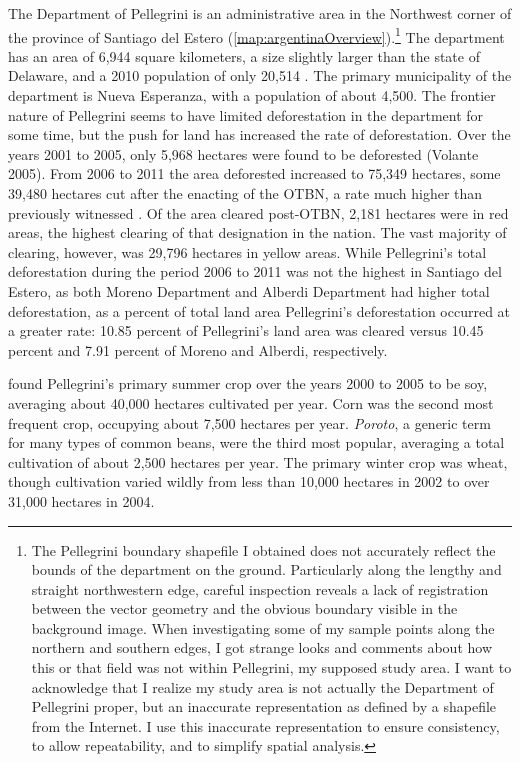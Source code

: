 The Department of Pellegrini is an administrative area in the Northwest corner of the province of Santiago del Estero (\autoref{map:argentinaOverview}).\footnote{The Pellegrini boundary shapefile I obtained does not accurately reflect the bounds of the department on the ground. Particularly along the lengthy and straight northwestern edge, careful inspection reveals a lack of registration between the vector geometry and the obvious boundary visible in the background image. When investigating some of my sample points along the northern and southern edges, I got strange looks and comments about how this or that field was not within Pellegrini, my supposed study area. I want to acknowledge that I realize my study area is not actually the Department of Pellegrini proper, but an inaccurate representation as defined by a shapefile from the Internet. I use this inaccurate representation to ensure consistency, to allow repeatability, and to simplify spatial analysis.} The department has an area of 6,944 square kilometers, a size slightly larger than the state of Delaware, and a 2010 population of only 20,514 \autocite{estadistica-y-c2010b}. The primary municipality of the department is Nueva Esperanza, with a population of about 4,500. The frontier nature of Pellegrini seems to have limited deforestation in the department for some time, but the push for land has increased the rate of deforestation. Over the years 2001 to 2005, only 5,968 hectares were found to be deforested (Volante 2005). From 2006 to 2011 the area deforested increased to 75,349 hectares, some 39,480 hectares cut after the enacting of the OTBN, a rate much higher than previously witnessed \autocite{secreteria-de-a2012monitoreo}. Of the area cleared post-OTBN, 2,181 hectares were in red areas, the highest clearing of that designation in the nation. The vast majority of clearing, however, was 29,796 hectares in yellow areas. While Pellegrini’s total deforestation during the period 2006 to 2011 was not the highest in Santiago del Estero, as both Moreno Department and Alberdi Department had higher total deforestation, as a percent of total land area Pellegrini’s deforestation occurred at a greater rate: 10.85 percent of Pellegrini’s land area was cleared versus 10.45 percent and 7.91 percent of Moreno and Alberdi, respectively.

\textcite{volante2005analisis} found Pellegrini's primary summer crop over the years 2000 to 2005 to be soy, averaging about 40,000 hectares cultivated per year. Corn was the second most frequent crop, occupying about 7,500 hectares per year. \textit{Poroto}, a generic term for many types of common beans, were the third most popular, averaging a total cultivation of about 2,500 hectares per year. The primary winter crop was wheat, though cultivation varied wildly from less than 10,000 hectares in 2002 to over 31,000 hectares in 2004.


